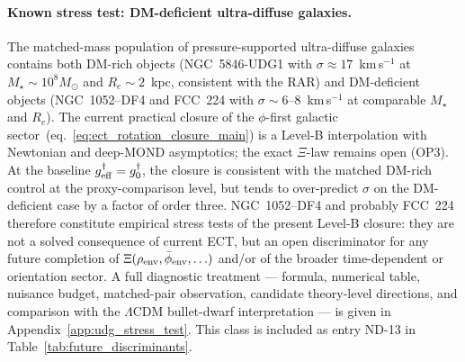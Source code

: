 %
%

\paragraph{Known stress test: DM-deficient ultra-diffuse galaxies.}
The matched-mass population of pressure-supported ultra-diffuse
galaxies contains both DM-rich objects (NGC~5846-UDG1 with
$\sigma\approx 17$~km\,s$^{-1}$ at $M_\star\sim 10^{8}M_\odot$ and
$R_e\sim 2$~kpc, consistent with the RAR) and DM-deficient objects
(NGC~1052--DF4 and FCC~224 with $\sigma\sim 6$--$8$~km\,s$^{-1}$ at
comparable $M_\star$ and $R_e$). The current practical closure of the
$\phi$-first galactic sector~(eq.~\ref{eq:ect_rotation_closure_main})
is a Level-B interpolation with Newtonian and deep-MOND asymptotics;
the exact $\Xi$-law remains open (OP3). At the baseline
$g^\dagger_{\rm eff}=g^\dagger_0$, the closure is consistent with the
matched DM-rich control at the proxy-comparison level, but tends to
over-predict $\sigma$ on the DM-deficient case by a factor of order
three. NGC~1052--DF4 and probably FCC~224 therefore constitute
empirical stress tests of the present Level-B closure: they are not a
solved consequence of current ECT, but an open discriminator for any
future completion of
$\Xi(\rho_{\rm env},\bar\phi_{\rm env},\ldots)$ and/or of the broader
time-dependent or orientation sector. A full diagnostic treatment ---
formula, numerical table, nuisance budget, matched-pair observation,
candidate theory-level directions, and comparison with the
$\Lambda$CDM bullet-dwarf interpretation --- is given in
Appendix~\ref{app:udg_stress_test}. This class is included as entry
ND-13 in Table~\ref{tab:future_discriminants}.
